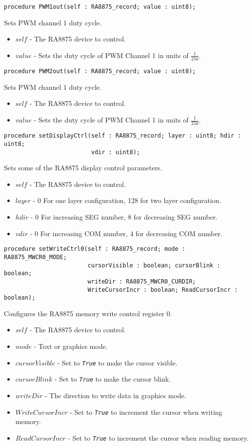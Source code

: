 \documentclass[10pt, openany]{book}
\newcommand{\constant}[1]{\emph{\texttt{#1}}}
\begin{document}
\begin{lstlisting}
procedure PWM1out(self : RA8875_record; value : uint8);
\end{lstlisting}
Sets PWM channel 1 duty cycle.
\begin{itemize}
  \item $self$ - The RA8875 device to control.
  \item $value$ - Sets the duty cycle of PWM Channel 1 in units of $\frac{1}{256}$.
\end{itemize}

\begin{lstlisting}
procedure PWM2out(self : RA8875_record; value : uint8);
\end{lstlisting}
Sets PWM channel 1 duty cycle.
\begin{itemize}
  \item $self$ - The RA8875 device to control.
  \item $value$ - Sets the duty cycle of PWM Channel 1 in units of $\frac{1}{256}$.
\end{itemize}

\begin{lstlisting}
procedure setDisplayCtrl(self : RA8875_record; layer : uint8; hdir : uint8;
                         vdir : uint8);
\end{lstlisting}
Sets some of the RA8875 display control parameters.
\begin{itemize}
  \item $self$ - The RA8875 device to control.
  \item $layer$ - 0 For one layer configuration, 128 for two layer configuration.
  \item $hdir$ - 0 For increasing SEG number, 8 for decreasing SEG number.
  \item $vdir$ - 0 For increasing COM number, 4 for decreasing COM number.
\end{itemize}

\begin{lstlisting}
procedure setWriteCtrl0(self : RA8875_record; mode : RA8875_MWCR0_MODE;
                        cursorVisible : boolean; cursorBlink : boolean;
                        writeDir : RA8875_MWCR0_CURDIR;
                        WriteCursorIncr : boolean; ReadCursorIncr : boolean);
\end{lstlisting}
Configures the RA8875 memory write control register 0.
\begin{itemize}
  \item $self$ - The RA8875 device to control.
  \item $mode$ - Text or graphics mode.
  \item $cursorVisible$ - Set to \constant{True} to make the cursor visible.
  \item $cursorBlink$ - Set to \constant{True} to make the cursor blink.
  \item $writeDir$ - The direction to write data in graphics mode.
  \item $WriteCursorIncr$ - Set to \constant{True} to increment the cursor when writing memory.
  \item $ReadCursorIncr$ - Set to \constant{True} to increment the cursor when reading memory.
\end{itemize}
\end{document}
